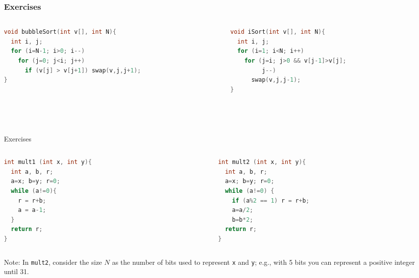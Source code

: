\documentclass[aspectratio=169]{beamer}
\begin{document}
\begin{frame}[fragile]\frametitle{Exercises}
  
\begin{columns}
\begin{column}{0.48\textwidth}
\begin{lstlisting}[language=C++]
void bubbleSort(int v[], int N){
  int i, j;
  for (i=N-1; i>0; i--)
    for (j=0; j<i; j++)
      if (v[j] > v[j+1]) swap(v,j,j+1);
}
\end{lstlisting}
\end{column}
\begin{column}{0.48\textwidth}
\begin{lstlisting}[language=C++]
void iSort(int v[], int N){
  int i, j;
  for (i=1; i<N; i++)
    for (j=i; j>0 && v[j-1]>v[j];
         j--)
      swap(v,j,j-1);
}
\end{lstlisting}
\end{column}
\end{columns}

~\\[-12mm]
~\\[-12mm]
\end{frame}

\begin{frame}[fragile]{Exercises}
  
\begin{columns}
\begin{column}{0.48\textwidth}
\begin{lstlisting}[language=C++]
int mult1 (int x, int y){
  int a, b, r;
  a=x; b=y; r=0;
  while (a!=0){
    r = r+b;
    a = a-1;
  }
  return r;
}
\end{lstlisting}
\end{column}
\begin{column}{0.48\textwidth}
\begin{lstlisting}[language=C++]
int mult2 (int x, int y){
  int a, b, r;
  a=x; b=y; r=0;
  while (a!=0) {
    if (a%2 == 1) r = r+b;
    a=a/2;
    b=b*2;
  return r;
}
\end{lstlisting}
\end{column}
\end{columns}
Note: In \texttt{mult2}, consider the size $N$ as the number of bits used to represent \texttt{x} and \texttt{y}; e.g., with 5 bits you can represent a positive integer until 31.

\end{frame}
\end{document}

